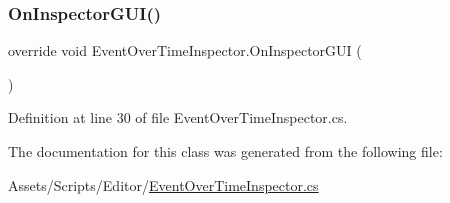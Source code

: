 \subsubsection{\texorpdfstring{On\+Inspector\+G\+U\+I()}{OnInspectorGUI()}}
{\footnotesize\ttfamily override void Event\+Over\+Time\+Inspector.\+On\+Inspector\+G\+UI (\begin{DoxyParamCaption}{ }\end{DoxyParamCaption})}



Definition at line 30 of file Event\+Over\+Time\+Inspector.\+cs.



The documentation for this class was generated from the following file\+:\begin{DoxyCompactItemize}
\item 
Assets/\+Scripts/\+Editor/\mbox{\hyperlink{_event_over_time_inspector_8cs}{Event\+Over\+Time\+Inspector.\+cs}}\end{DoxyCompactItemize}
